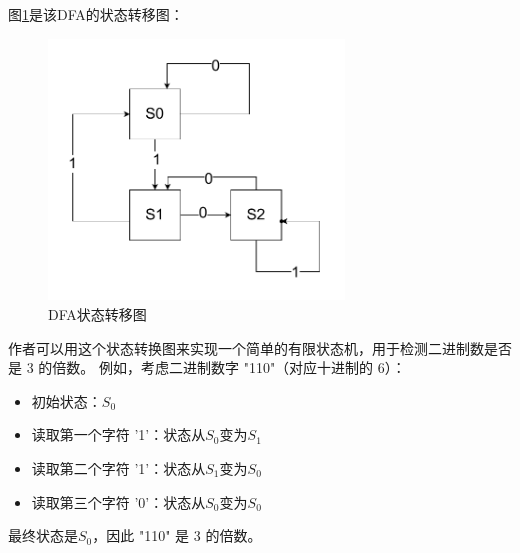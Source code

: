 图\ref{fig:DFA状态转移图}是该DFA的状态转移图：
\begin{figure}[htbp]
	\centering
	\includegraphics[width=0.7\textwidth]{pictures/DFA状态转移图.pdf}
	\caption{DFA状态转移图}
	\label{fig:DFA状态转移图}
\end{figure}
作者可以用这个状态转换图来实现一个简单的有限状态机，用于检测二进制数是否是 3 的倍数。
例如，考虑二进制数字 "110"（对应十进制的 6）：
\begin{itemize}
	\item 初始状态：$ S_0 $
	\item 读取第一个字符 '1'：状态从$ S_0 $变为$ S_1 $
	\item 读取第二个字符 '1'：状态从$ S_1 $变为$ S_0 $
	\item 读取第三个字符 '0'：状态从$ S_0 $变为$ S_0 $
\end{itemize}
最终状态是$ S_0 $，因此 "110" 是 3 的倍数。

